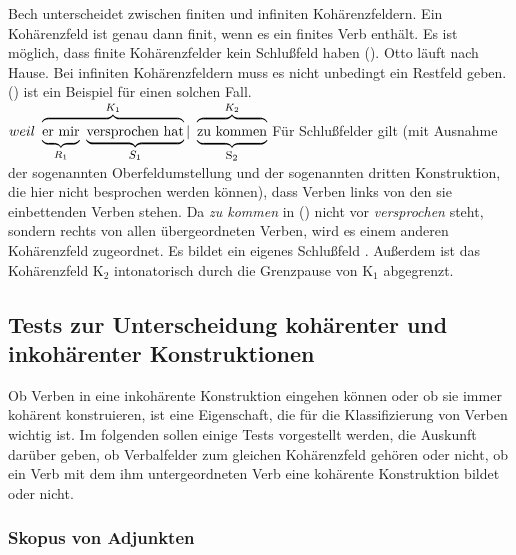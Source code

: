 Bech unterscheidet zwischen finiten und infiniten Kohärenzfeldern. Ein Kohärenzfeld ist genau
dann finit, wenn es ein finites Verb enthält. Es ist möglich, dass finite Kohärenzfelder 
kein Schlußfeld haben ().
\ea
Otto läuft nach Hause.
\z
Bei infiniten Kohärenzfeldern muss es nicht unbedingt ein Restfeld geben. () ist ein Beispiel
für einen solchen Fall.
\ea
${weil~\overbrace{\underbrace{\rule[-0.5ex]{0cm}{2.5ex}{\textrm{er~mir}}
                                   }_{R_1}~
                        \underbrace{\textrm{versprochen~hat}
                                   }_{\mbox{\footnotesize $S_1$}}}^{K_1}|~
        \overbrace{\underbrace{\rule[-0.5ex]{0cm}{2.5ex}{\textrm{zu~kommen}}
                              }_{\mbox{\footnotesize S$_2$}}}^{K_2}}$
\z
Für Schlußfelder gilt (mit Ausnahme der sogenannten Oberfeldumstellung und
der sogenannten dritten Konstruktion, die hier nicht besprochen werden
können), dass Verben links von den sie einbettenden Verben stehen. Da \emph{zu kommen} in ()
nicht vor \emph{versprochen} steht, sondern rechts von allen übergeordneten Verben, wird es einem
anderen Kohärenzfeld zugeordnet. Es bildet ein eigenes Schlußfeld \citep[\S 78]{Bech55a}. Außerdem
ist das Kohärenzfeld K$_2$ intonatorisch durch die Grenzpause von K$_1$ abgegrenzt.

\subsection{Tests zur Unterscheidung kohärenter und inkohärenter Konstruktionen}
\label{sec-coh-incoh}

Ob Verben in eine inkohärente Konstruktion eingehen können oder ob sie immer kohärent konstruieren,
ist eine Eigenschaft, die für die Klassifizierung von Verben wichtig ist. Im folgenden sollen einige
Tests vorgestellt werden, die Auskunft darüber geben, ob Verbalfelder zum gleichen Kohärenzfeld
gehören oder nicht, \dash ob ein Verb mit dem ihm untergeordneten Verb eine kohärente Konstruktion
bildet oder nicht.

\subsubsection{Skopus von Adjunkten}
\label{sec-skopus-kohaerent}

